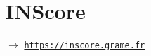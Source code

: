 \newpage

{}
\thispagestyle{empty}

\section*{INScore}
\label{inscore}

$\rightarrow$ \href{https://inscore.grame.fr}{\texttt{\small https://inscore.grame.fr}}




